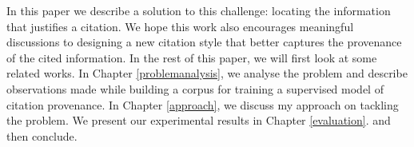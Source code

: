 In this paper we describe a solution to this challenge: locating the information that justifies a citation. 
We hope this work also encourages meaningful discussions to designing a new citation style that better captures the provenance of the cited information. In the rest of this paper, we will first look at some related works. In Chapter \ref{problemanalysis}, we analyse the problem and describe observations made while building a corpus for training a supervised model of citation provenance. In Chapter \ref{approach}, we discuss my approach on tackling the problem. We present our experimental results in Chapter \ref{evaluation}. and then conclude.